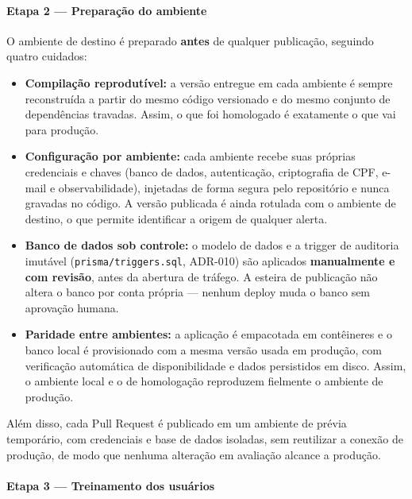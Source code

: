 \paragraph{Etapa 2 — Preparação do ambiente}

O ambiente de destino é preparado \textbf{antes} de qualquer publicação, seguindo quatro cuidados:

\begin{itemize}
\item \textbf{Compilação reprodutível:} a versão entregue em cada ambiente é sempre reconstruída a partir do mesmo código versionado e do mesmo conjunto de dependências travadas. Assim, o que foi homologado é exatamente o que vai para produção.
\item \textbf{Configuração por ambiente:} cada ambiente recebe suas próprias credenciais e chaves (banco de dados, autenticação, criptografia de CPF, e-mail e observabilidade), injetadas de forma segura pelo repositório e nunca gravadas no código. A versão publicada é ainda rotulada com o ambiente de destino, o que permite identificar a origem de qualquer alerta.
\item \textbf{Banco de dados sob controle:} o modelo de dados e a trigger de auditoria imutável (\texttt{prisma/\allowbreak\hspace{0pt plus 1pt}triggers.\allowbreak\hspace{0pt plus 1pt}sql}, ADR-010) são aplicados \textbf{manualmente e com revisão}, antes da abertura de tráfego. A esteira de publicação não altera o banco por conta própria — nenhum deploy muda o banco sem aprovação humana.
\item \textbf{Paridade entre ambientes:} a aplicação é empacotada em contêineres e o banco local é provisionado com a mesma versão usada em produção, com verificação automática de disponibilidade e dados persistidos em disco. Assim, o ambiente local e o de homologação reproduzem fielmente o ambiente de produção.
\end{itemize}

Além disso, cada Pull Request é publicado em um ambiente de prévia temporário, com credenciais e base de dados isoladas, sem reutilizar a conexão de produção, de modo que nenhuma alteração em avaliação alcance a produção.

\paragraph{Etapa 3 — Treinamento dos usuários}

